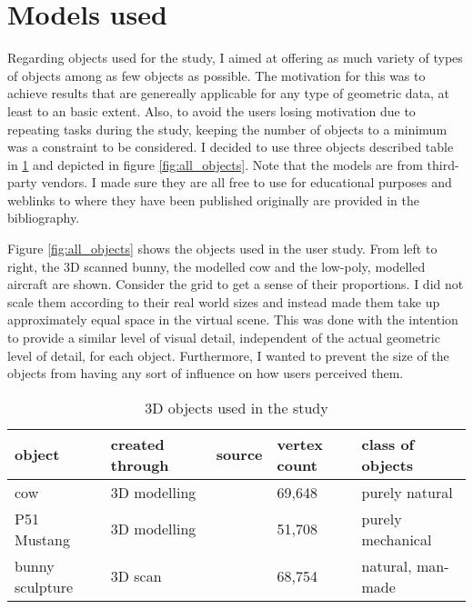 

	\section{Models used}
	\label{sec:models_used}
%
%

Regarding objects used for the study, I aimed at offering as much variety of types of objects among as few objects as possible. The motivation for this was to achieve results that are genereally applicable for any type of geometric data, at least to an basic extent. Also, to avoid the users losing motivation due to repeating tasks during the study, keeping the number of objects to a minimum was a constraint to be considered. I decided to use three objects described table in \ref{tab:userstudy_objects} and depicted in figure \ref{fig:all_objects}. Note that the models are from third-party vendors. I made sure they are all free to use for educational purposes and weblinks to where they have been published originally are provided in the bibliography.

Figure \ref{fig:all_objects} shows the objects used in the user study. From left to right, the 3D scanned bunny, the modelled cow and the low-poly, modelled aircraft are shown. Consider the grid to get a sense of their proportions. I did not scale them according to their real world sizes and instead made them take up approximately equal space in the virtual scene. This was done with the intention to provide a similar level of visual detail, independent of the actual geometric level of detail, for each object. Furthermore, I wanted to prevent the size of the objects from having any sort of influence on how users perceived them.

\begin{table}[]
\centering
	\begin{tabular}{l|l|l|l|l}
		object	& created through	& source	& vertex count	& class of objects	\\ \hline
		cow	& 3D modelling		& \cite{cow}	& 69,648	& purely natural	\\
		P51 Mustang	&	3D modelling	& \cite{P51}	& 51,708	& purely mechanical	\\
		bunny sculpture	&	3D scan	& \cite{bun}	& 68,754	& natural, man-made	
	\end{tabular}
	\caption{3D objects used in the study}
	\label{tab:userstudy_objects}
\end{table}


